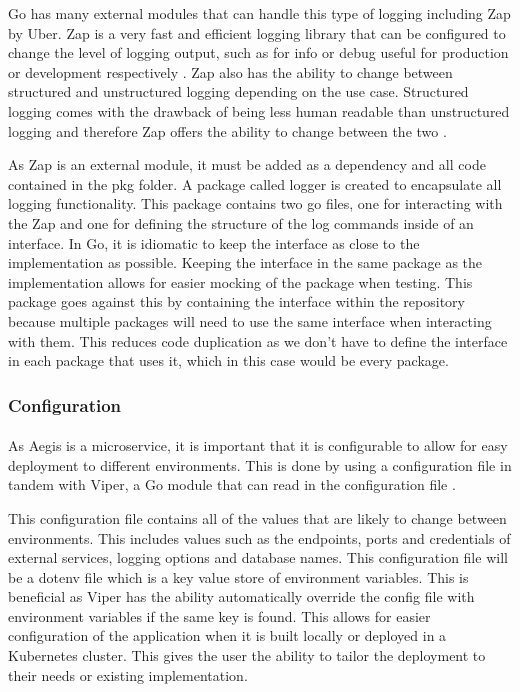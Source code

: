 \documentclass[12pt, conference, final, a4paper, onecolumn, compsoc]{IEEEtran}
\begin{document}
Go has many external modules that can handle this type of logging including Zap
by Uber. Zap is a very fast and efficient logging library that can be configured
to change the level of logging output, such as for info or debug useful for
production or development respectively \citep{zap-repo}. Zap also has the
ability to change between structured and unstructured logging depending on the
use case. Structured logging comes with the drawback of being less human
readable than unstructured logging and therefore Zap offers the ability to
change between the two \citep{zap-repo}.

As Zap is an external module, it must be added as a dependency and all code
contained in the pkg folder. A package called logger is created to encapsulate
all logging functionality. This package contains two go files, one for
interacting with the Zap and one for defining the structure of the log commands
inside of an interface. In Go, it is idiomatic to keep the interface as close to
the implementation as possible. Keeping the interface in the same package as the
implementation allows for easier mocking of the package when testing. This
package goes against this by containing the interface within the repository
because multiple packages will need to use the same interface when interacting
with them. This reduces code duplication as we don't have to define the
interface in each package that uses it, which in this case would be every
package.

\subsubsection*{Configuration}
\paragraph{}

As Aegis is a microservice, it is important that it is configurable to allow for
easy deployment to different environments. This is done by using a configuration
file in tandem with Viper, a Go module that can read in the configuration file
\citep{viper-repo}.

This configuration file contains all of the values that are likely to change
between environments. This includes values such as the endpoints, ports and
credentials of external services, logging options and database names. This
configuration file will be a dotenv file which is a key value store of
environment variables. This is beneficial as Viper has the ability automatically
override the config file with environment variables if the same key is found.
This allows for easier configuration of the application when it is built locally
or deployed in a Kubernetes cluster. This gives the user the ability to tailor
the deployment to their needs or existing implementation.
\end{document}
